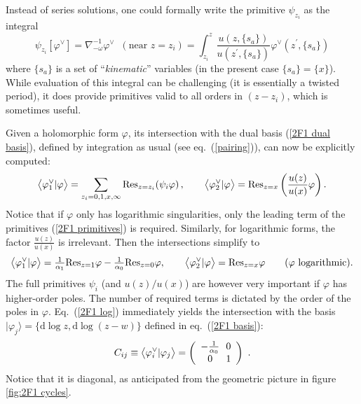 \documentclass[11pt]{article}
\renewcommand{\d}{\text{d}}
\newcommand{\be}{\begin{equation}}
\newcommand{\ee}{\end{equation}}
\newcommand{\braket}[2]{\big\langle{#1}|{#2}\big\rangle}
\newcommand{\ket}[1]{|{#1}\big\rangle}
\newcommand{\dual}{\vee}
\newcommand{\vphi}{\varphi}
\begin{document}
Instead of series solutions, one could formally write the primitive $\psi_{z_i}$ as the integral
\be
	\psi_{z_i} [\vphi^\vee]
	= \nabla_{-\omega}^{-1} \vphi^\vee \;\; (\text{near } z=z_i)
	= \int_{z_i}^z \frac{u(z,\{s_a\})}{u(z^\prime,\{s_a\})} \vphi^\vee(z^\prime,\{s_a\})
\ee
where $\{s_a\}$ is a set of ``\textit{kinematic}'' variables (in the present case $\{s_a\} = \{x\}$). While evaluation of this integral can be challenging (it is essentially a twisted period), it does provide primitives valid to all orders in $(z-z_i)$, which is sometimes useful. 


Given a holomorphic form $\vphi$, its intersection with the dual basis (\ref{2F1 dual basis}),
defined by integration as usual (see eq.~(\ref{pairing})),
can now be explicitly computed:
\be
 \braket{\vphi_1^\dual}{\vphi} = \sum_{z_i=0,1,x,\infty} {\rm Res}_{z=z_i} (\psi_i \vphi)\,, \qquad
 \braket{\vphi_2^\dual}{\vphi} = {\rm Res}_{z=x} \left(\frac{u(z)}{u(x)} \vphi\right). \label{2F1 residues}
\ee
Notice that if $\vphi$ only has logarithmic singularities, only the leading term of the primitives (\ref{2F1 primitives})
is required. Similarly, for logarithmic forms, the factor $\frac{u(z)}{u(x)}$ is irrelevant. Then the intersections simplify to
\be
 \braket{\vphi_1^\dual}{\vphi} = \tfrac{1}{\alpha_1}{\rm Res}_{z=1} \vphi-\tfrac{1}{\alpha_0}{\rm Res}_{z=0}\vphi,\qquad
 \braket{\vphi_2^\dual}{\vphi} = {\rm Res}_{z=x} \vphi \qquad\mbox{($\vphi$ logarithmic)}. \label{2F1 log}
\ee
The full primitives $\psi_i$ (and $u(z)/u(x)$) are however very important
if $\vphi$ has higher-order poles. The number of required terms is dictated by the order of the poles in $\vphi$.
Eq.~(\ref{2F1 log}) immediately yields the intersection with the basis $\ket{\vphi_j} = \{ \d\log z,\d\log(z-w)\}$ defined
in eq.~(\ref{2F1 basis}):
\be
 C_{ij} \equiv \braket{\vphi^\dual_i}{\vphi_j} =
 \left(	\begin{array}{c@{\ \ }c} -\frac{1}{\alpha_0} & 0\\0 & 1\end{array} \right)\ . \label{2F1 Cij}
\ee
Notice that it is diagonal, as anticipated from the geometric picture in figure \ref{fig:2F1 cycles}.
\end{document}
